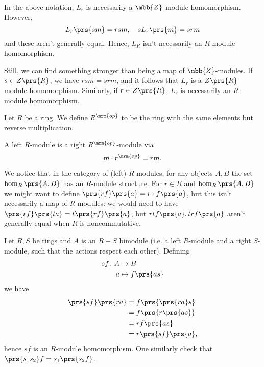\documentclass[11pt]{kbook}
\newcommand{\op}{{\mrm{op}}}
\begin{document}
\begin{remark}
In the above notation, $L_r$ is necessarily a $\mbb{Z}$-module homomorphism. However,
\[L_r\prs{sm} = rsm, \quad s L_r\prs{m} = srm\]
and these aren't generally equal. Hence, $L_R$ isn't necessarily an $R$-module homomorphism.

Still, we can find something stronger than being a map of $\mbb{Z}$-modules.
If $s \in Z\prs{R}$, we have $rsm = srm$, and it follows that $L_r$ is a ${Z}\prs{R}$-module homomorphism. Similarly, if $r \in Z\prs{R}$, $L_r$ is necessarily an $R$-module homomorphism.
\end{remark}

\begin{definition}
Let $R$ be a ring. We define $R^\op$ to be the ring with the same elements but reverse multiplication.
\end{definition}

\begin{remark}
A left $R$-module is a right $R^\op$-module via
\[m \cdot r^\op = r m \text{.}\]
\end{remark}


We notice that in the category of (left) $R$-modules, for any objects $A,B$ the set $\hom_R\prs{A,B}$ has an $R$-module structure.
For $r \in R$ and $\hom_R\prs{A,B}$ we might want to define $\prs{rf}\prs{a} = r \cdot f\prs{a}$, but this isn't necessarily a map of $R$-modules: we would need to have $\prs{rf}\prs{ta} = t \prs{rf}\prs{a}$, but $r t f\prs{a}, t r f\prs{a}$ aren't generally equal when $R$ is noncommutative.

\begin{example}
Let $R,S$ be rings and $A$ is an $R-S$ bimodule (i.e. a left $R$-module and a right $S$-module, such that the actions respect each other).
Defining
\begin{align*}
sf \colon A &\to B \\
a &\mapsto f\prs{as}
\end{align*}
we have
\begin{align*}
\prs{sf}\prs{ra} &= f\prs{\prs{ra}s}
\\&= f\prs{r\prs{as}}
\\&= rf\prs{as}
\\&= r\prs{sf}\prs{a} \text{,}
\end{align*}
hence $sf$ is an $R$-module homomorphism.
One similarly check that $\prs{s_1 s_2} f = s_1 \prs{s_2 f}$.
\end{example}
\end{document}
